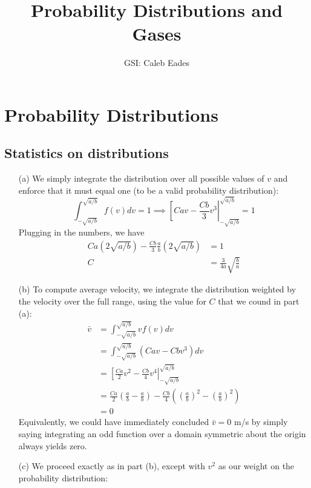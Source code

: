 \documentclass{article}
\begin{document}
	
\title{Probability Distributions and Gases}
\author{GSI: Caleb Eades}
\maketitle

\section{Probability Distributions}

\subsection{Statistics on distributions}

\begin{itemize}
	\item[(a)] We simply integrate the distribution over all possible values of $v$ and enforce that it must equal one (to be a valid probability distribution):
	\begin{equation}
	\int_{-\sqrt{a/b}}^{\sqrt{a/b}}f(v)dv = 1 \implies \left[ Cav - \frac{Cb}{3}v^3\right|_{-\sqrt{a/b}}^{\sqrt{a/b}} = 1
	\end{equation}
	Plugging in the numbers, we have
	\begin{align*}
	Ca(2\sqrt{a/b})-\frac{Cb}{3}\frac{a}{b}(2\sqrt{a/b}) &= 1 \\
	C &= \frac{3}{4a}\sqrt{\frac{b}{a}}
	\end{align*}
	\item[(b)] To compute average velocity, we integrate the distribution weighted by the velocity over the full range, using the value for $C$ that we cound in part (a):
	\begin{align*}
	\bar{v} &= \int_{-\sqrt{a/b}}^{\sqrt{a/b}}vf(v)dv \\
	&= \int_{-\sqrt{a/b}}^{\sqrt{a/b}}(Cav-Cbv^3)dv \\
	&= \left[ \frac{Ca}{2}v^2 - \frac{Cb}{4}v^4\right|_{-\sqrt{a/b}}^{\sqrt{a/b}} \\
	&= \frac{Ca}{2}\left(\frac{a}{b}-\frac{a}{b}\right) - \frac{Cb}{4}\left(\left(\frac{a}{b}\right)^2-\left(\frac{a}{b}\right)^2\right) \\
	&= 0
	\end{align*}
	Equivalently, we could have immediately concluded $\bar{v} = 0$ m/s by simply saying integrating an odd function over a domain symmetric about the origin always yields zero.
	\item[(c)] We proceed exactly as in part (b), except with $v^2$ as our weight on the probability distribution:

\end{itemize}
\end{document}
